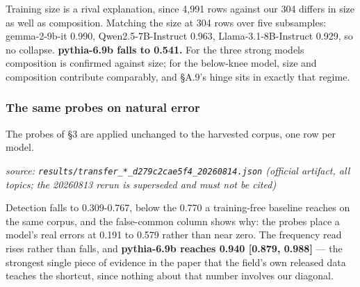 \documentclass[10pt]{article}
\begin{document}
Training size is a rival explanation, since 4,991 rows against our 304 differs in size as well as composition. Matching the size at 304 rows over five subsamples: gemma-2-9b-it 0.990, Qwen2.5-7B-Instruct 0.963, Llama-3.1-8B-Instruct 0.929, so no collapse. \textbf{pythia-6.9b falls to 0.541.} For the three strong models composition is confirmed against size; for the below-knee model, size and composition contribute comparably, and §A.9's hinge sits in exactly that regime.

\subsubsection{The same probes on natural error}

The probes of §3 are applied unchanged to the harvested corpus, one row per model.

{\footnotesize\raggedright\sloppy \emph{source: \texttt{results/transfer\_*\_d279c2cae5f4\_20260814.json} (official artifact, all topics; the 20260813 rerun is superseded and must not be cited)}\par}

\begin{table}[H]
\centering
\small
{}
\end{table}

Detection falls to 0.309-0.767, below the 0.770 a training-free baseline reaches on the same corpus, and the false-common column shows why: the probes place a model's real errors at 0.191 to 0.579 rather than near zero. The frequency read rises rather than falls, and \textbf{pythia-6.9b reaches 0.940 [0.879, 0.988]} --- the strongest single piece of evidence in the paper that the field's own released data teaches the shortcut, since nothing about that number involves our diagonal.
\end{document}
